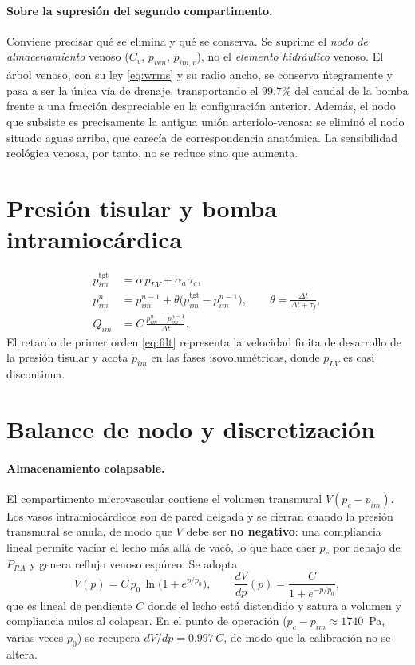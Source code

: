 \documentclass[11pt]{article}
\begin{document}
\paragraph{Sobre la supresi\'on del segundo compartimento.} Conviene precisar
qu\'e se elimina y qu\'e se conserva. Se suprime el \emph{nodo de
almacenamiento} venoso ($C_v$, $p_{ven}$, $p_{im,v}$), no el \emph{elemento
hidr\'aulico} venoso. El \'arbol venoso, con su ley \eqref{eq:wrms} y su radio
ancho, se conserva \'ntegramente y pasa a ser la \'unica v\'ia de drenaje,
transportando el $99.7\%$ del caudal de la bomba frente a una fracci\'on
despreciable en la configuraci\'on anterior. Adem\'as, el nodo que subsiste es
precisamente la antigua uni\'on arteriolo-venosa: se elimin\'o el nodo situado
aguas arriba, que carec\'ia de correspondencia anat\'omica. La sensibilidad
reol\'ogica venosa, por tanto, no se reduce sino que aumenta.

\section{Presi\'on tisular y bomba intramioc\'ardica}

\begin{align}
  p_{im}^{\text{tgt}} &= \alpha\,p_{LV}+\alpha_a\,\tau_c,
  \label{eq:tgt}\\
  p_{im}^{n} &= p_{im}^{n-1}+\theta\bigl(p_{im}^{\text{tgt}}-p_{im}^{n-1}\bigr),
  \qquad \theta=\frac{\Delta t}{\Delta t+\tau_f},
  \label{eq:filt}\\
  Q_{im}&=C\,\frac{p_{im}^{n}-p_{im}^{n-1}}{\Delta t}.
  \label{eq:pump}
\end{align}
El retardo de primer orden \eqref{eq:filt} representa la velocidad finita de
desarrollo de la presi\'on tisular y acota $\dot p_{im}$ en las fases
isovolum\'etricas, donde $p_{LV}$ es casi discontinua.

\section{Balance de nodo y discretizaci\'on}

\paragraph{Almacenamiento colapsable.} El compartimento microvascular contiene
el volumen transmural $V(p_c-p_{im})$. Los vasos intramioc\'ardicos son de pared
delgada y se cierran cuando la presi\'on transmural se anula, de modo que $V$
debe ser \textbf{no negativo}: una compliancia lineal permite vaciar el lecho
m\'as all\'a de vac\'o, lo que hace caer $p_c$ por debajo de $P_{RA}$ y genera
reflujo venoso esp\'ureo. Se adopta
\begin{equation}
  V(p)=C\,p_0\,\ln\!\bigl(1+e^{p/p_0}\bigr),
  \qquad
  \frac{dV}{dp}(p)=\frac{C}{1+e^{-p/p_0}},
  \label{eq:vcol}
\end{equation}
que es lineal de pendiente $C$ donde el lecho est\'a distendido y satura a
volumen y compliancia nulos al colapsar. En el punto de operaci\'on
($p_c-p_{im}\approx1740$~Pa, varias veces $p_0$) se recupera
$dV/dp=0.997\,C$, de modo que la calibraci\'on no se altera.
\end{document}
